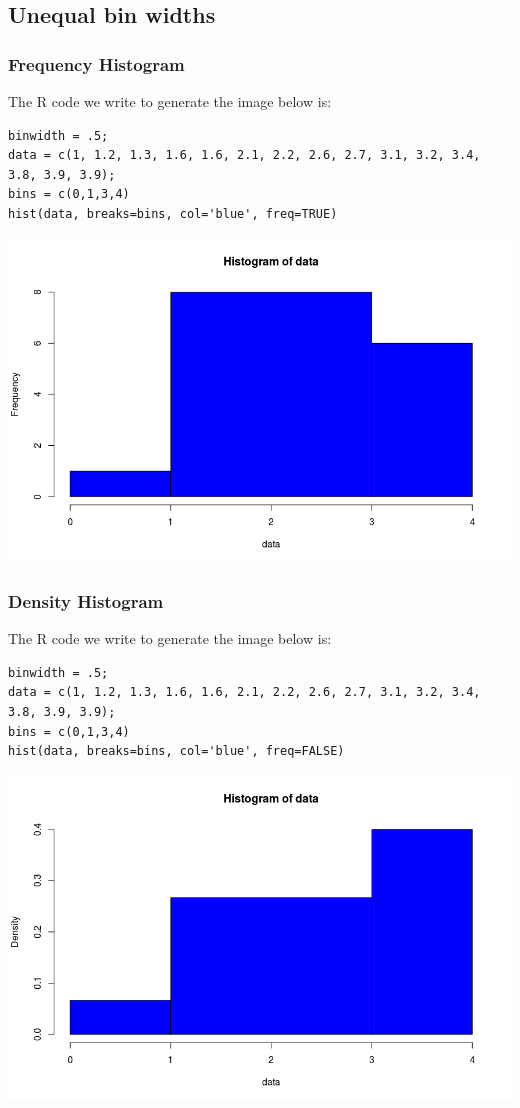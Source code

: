 \documentclass[a4paper,11pt]{article}
\begin{document}
\subsection{Unequal bin widths}

\subsubsection{Frequency Histogram}

The R code we write to generate the image below is:

\begin{lstlisting}
binwidth = .5;
data = c(1, 1.2, 1.3, 1.6, 1.6, 2.1, 2.2, 2.6, 2.7, 3.1, 3.2, 3.4, 3.8, 3.9, 3.9);
bins = c(0,1,3,4)
hist(data, breaks=bins, col='blue', freq=TRUE)
\end{lstlisting}

\includegraphics[scale=0.5]{freql-unequal-hist.png}

\subsubsection{Density Histogram}

The R code we write to generate the image below is:

\begin{lstlisting}
binwidth = .5;
data = c(1, 1.2, 1.3, 1.6, 1.6, 2.1, 2.2, 2.6, 2.7, 3.1, 3.2, 3.4, 3.8, 3.9, 3.9);
bins = c(0,1,3,4)
hist(data, breaks=bins, col='blue', freq=FALSE)
\end{lstlisting}

\includegraphics[scale=0.5]{dens-hist-unequal}

\printbibliography{}
\end{document}
